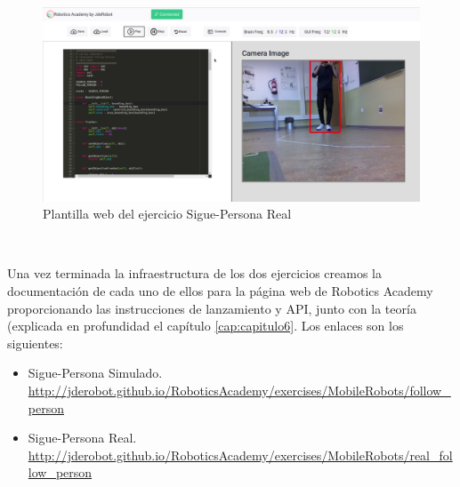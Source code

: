 \begin{figure} [H]
  \begin{center}
    \includegraphics[width=15cm]{imagenes/cap5/plantilla-web-real-follow-person.png}
  \end{center}
  \caption[Plantilla web del ejercicio Sigue-Persona Real]{Plantilla web del ejercicio Sigue-Persona Real}
  \label{fig:plantilla_web_real_follow_person}
\end{figure}\

Una vez terminada la infraestructura de los dos ejercicios creamos la documentación de cada uno de ellos para la página web de Robotics Academy proporcionando las instrucciones de lanzamiento y API, junto con la teoría (explicada en profundidad el capítulo \ref{cap:capitulo6}. Los enlaces son los siguientes:
\begin{itemize}
	\item Sigue-Persona Simulado.\\\url{http://jderobot.github.io/RoboticsAcademy/exercises/MobileRobots/follow_person}
	\item Sigue-Persona Real.\\\url{http://jderobot.github.io/RoboticsAcademy/exercises/MobileRobots/real_follow_person}
\end{itemize}

